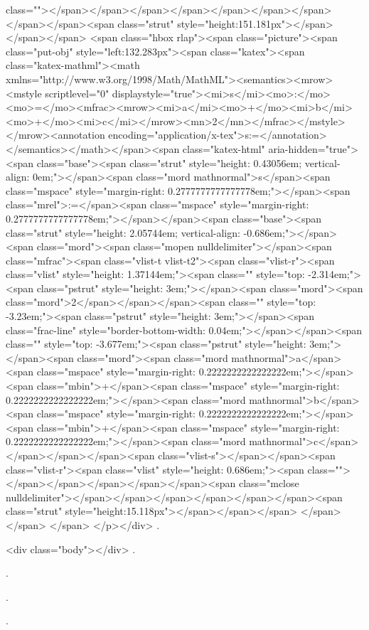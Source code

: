class=""></span></span></span></span></span></span></span></span></span><span class="strut" style="height:151.181px"></span></span></span>
<span class="hbox rlap"><span class="picture"><span class="put-obj" style="left:132.283px"><span class="katex"><span class="katex-mathml"><math xmlns="http://www.w3.org/1998/Math/MathML"><semantics><mrow><mstyle scriptlevel="0" displaystyle="true"><mi>s</mi><mo>:</mo><mo>=</mo><mfrac><mrow><mi>a</mi><mo>+</mo><mi>b</mi><mo>+</mo><mi>c</mi></mrow><mn>2</mn></mfrac></mstyle></mrow><annotation encoding="application/x-tex">\displaystyle s:=</annotation></semantics></math></span><span class="katex-html" aria-hidden="true"><span class="base"><span class="strut" style="height: 0.43056em; vertical-align: 0em;"></span><span class="mord mathnormal">s</span><span class="mspace" style="margin-right: 0.2777777777777778em;"></span><span class="mrel">:=</span><span class="mspace" style="margin-right: 0.2777777777777778em;"></span></span><span class="base"><span class="strut" style="height: 2.05744em; vertical-align: -0.686em;"></span><span class="mord"><span class="mopen nulldelimiter"></span><span class="mfrac"><span class="vlist-t vlist-t2"><span class="vlist-r"><span class="vlist" style="height: 1.37144em;"><span class="" style="top: -2.314em;"><span class="pstrut" style="height: 3em;"></span><span class="mord"><span class="mord">2</span></span></span><span class="" style="top: -3.23em;"><span class="pstrut" style="height: 3em;"></span><span class="frac-line" style="border-bottom-width: 0.04em;"></span></span><span class="" style="top: -3.677em;"><span class="pstrut" style="height: 3em;"></span><span class="mord"><span class="mord mathnormal">a</span><span class="mspace" style="margin-right: 0.2222222222222222em;"></span><span class="mbin">+</span><span class="mspace" style="margin-right: 0.2222222222222222em;"></span><span class="mord mathnormal">b</span><span class="mspace" style="margin-right: 0.2222222222222222em;"></span><span class="mbin">+</span><span class="mspace" style="margin-right: 0.2222222222222222em;"></span><span class="mord mathnormal">c</span></span></span></span><span class="vlist-s">​</span></span><span class="vlist-r"><span class="vlist" style="height: 0.686em;"><span class=""></span></span></span></span></span><span class="mclose nulldelimiter"></span></span></span></span></span></span><span class="strut" style="height:15.118px"></span></span></span>
</span></span>​ </span>
</p></div>
.

<div class="body"></div>
.

.

.

.

